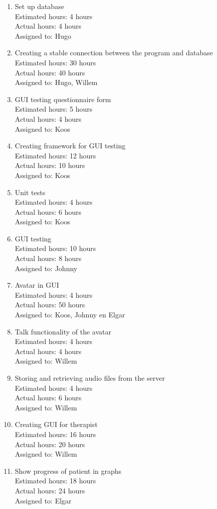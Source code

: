 \begin{enumerate}
\item
Set up database\\
Estimated hours: 4 hours\\
Actual hours: 4 hours\\
Assigned to: Hugo
\item
Creating a stable connection between the program and database\\
Estimated hours: 30 hours\\
Actual hours: 40 hours\\
Assigned to: Hugo, Willem
\item
GUI testing questionnaire form\\
Estimated hours: 5 hours\\
Actual hours: 4 hours\\
Assigned to: Koos
\item
Creating framework for GUI testing \\
Estimated hours: 12 hours\\
Actual hours: 10 hours\\
Assigned to: Koos
\item
Unit tests\\
Estimated hours: 4 hours\\
Actual hours: 6 hours\\
Assigned to: Koos
\item
GUI testing\\
Estimated hours: 10 hours\\
Actual hours: 8 hours\\
Assigned to: Johnny
\item
Avatar in GUI\\
Estimated hours: 4 hours\\
Actual hours: 50 hours\\
Assigned to: Koos, Johnny en Elgar
\item
Talk functionality of the avatar\\
Estimated hours: 4 hours\\
Actual hours: 4 hours\\
Assigned to: Willem
\item
Storing and retrieving audio files from the server\\
Estimated hours: 4 hours\\
Actual hours: 6 hours\\
Assigned to: Willem
\item
Creating GUI for therapist\\
Estimated hours: 16 hours\\
Actual hours: 20 hours\\
Assigned to: Willem
\item
Show progress of patient in graphs\\
Estimated hours: 18 hours\\
Actual hours: 24 hours\\
Assigned to: Elgar

\end{enumerate}


